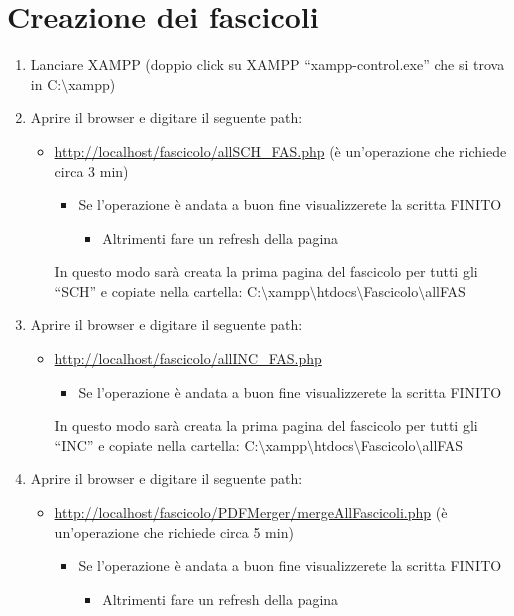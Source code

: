 \documentclass[
10pt, %
a4paper, %
oneside, %
headinclude,footinclude, %
BCOR5mm, %
]{scrartcl}
\begin{document}
\section{Creazione dei fascicoli}
\begin{enumerate}
\item Lanciare XAMPP (doppio click su XAMPP “xampp-control.exe” che si trova in C:$\setminus$xampp)
\item Aprire il browser e digitare il seguente path:
\begin{itemize}
\item \url{http://localhost/fascicolo/allSCH_FAS.php} (è un’operazione che richiede circa 3 min)
\begin{itemize}
\item Se l’operazione è andata a buon fine visualizzerete la scritta FINITO
\begin{itemize}
\item Altrimenti fare un refresh della pagina
\end{itemize}
\end{itemize}
In questo modo sarà creata la prima pagina del fascicolo per tutti gli “SCH” e copiate nella cartella: C:$\setminus$xampp$\setminus$htdocs$\setminus$Fascicolo$\setminus$allFAS
\end{itemize}
\item Aprire il browser e digitare il seguente path:
\begin{itemize}
\item \url{http://localhost/fascicolo/allINC_FAS.php}
\begin{itemize}
\item Se l’operazione è andata a buon fine visualizzerete la scritta FINITO
\end{itemize}
In questo modo sarà creata la prima pagina del fascicolo per tutti gli “INC” e copiate nella cartella: C:$\setminus$xampp$\setminus$htdocs$\setminus$Fascicolo$\setminus$allFAS
\end{itemize}
\item Aprire il browser e digitare il seguente path:
\begin{itemize}
\item \url{http://localhost/fascicolo/PDFMerger/mergeAllFascicoli.php} (è un’operazione che richiede circa 5 min)
\begin{itemize}
\item Se l’operazione è andata a buon fine visualizzerete la scritta FINITO
\begin{itemize}
\item Altrimenti fare un refresh della pagina

\end{itemize}
\end{itemize}
\end{itemize}
\end{enumerate}
\end{document}
